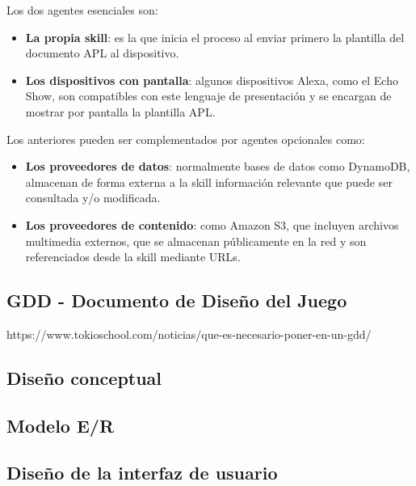 Los dos agentes esenciales son:
\begin{itemize}
	\item \textbf{La propia skill}: es la que inicia el proceso al enviar primero la plantilla del documento APL al dispositivo.
	\item \textbf{Los dispositivos con pantalla}: algunos dispositivos Alexa, como el Echo Show, son compatibles con este lenguaje de presentación y se encargan de mostrar por pantalla la plantilla APL. 
\end{itemize}

Los anteriores pueden ser complementados por agentes opcionales como: 
\begin{itemize}
	\item \textbf{Los proveedores de datos}: normalmente bases de datos como DynamoDB, almacenan de forma externa a la skill información relevante que puede ser consultada y/o modificada.
	\item \textbf{Los proveedores de contenido}: como Amazon S3, que incluyen archivos multimedia externos, que se almacenan públicamente en la red y son referenciados desde la skill mediante URLs. 
\end{itemize}

\subsection{GDD - Documento de Diseño del Juego}

https://www.tokioschool.com/noticias/que-es-necesario-poner-en-un-gdd/


\subsection{Diseño conceptual}

\subsection{Modelo E/R}

\subsection{Diseño de la interfaz de usuario}



